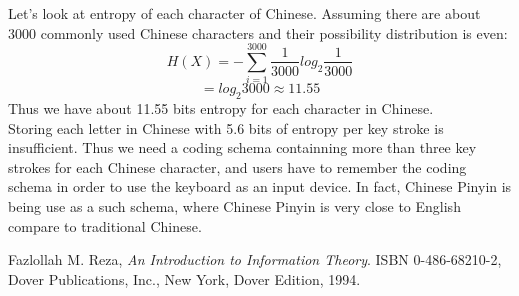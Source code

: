 \documentclass[12pt]{article}
\begin{document}
Let's look at entropy of each character of Chinese. Assuming there are about 3000 commonly used Chinese characters and their possibility distribution is even: 
\[
	H(X) = -\sum_{i=1}^{3000}\frac{1}{3000}log_{2}\frac{1}{3000}
\]
\[
	= log_{2}3000 \approx 11.55
\]
Thus we have about 11.55 bits entropy for each character in Chinese.\\
Storing each letter in Chinese with 5.6 bits of entropy per key stroke is insufficient. Thus we need a coding schema containning more than three key strokes for each Chinese character, and users have to remember the coding schema in order to use the keyboard as an input device. In fact, Chinese Pinyin is being use as a such schema, where Chinese Pinyin is very close to English compare to traditional Chinese.\\

\begin{thebibliography}{9}

  Fazlollah M. Reza,
  \emph{An Introduction to Information Theory}.
  ISBN 0-486-68210-2,
  Dover Publications, Inc., New York,
  Dover Edition,
  1994.

\end{thebibliography}

	
\end{document}
